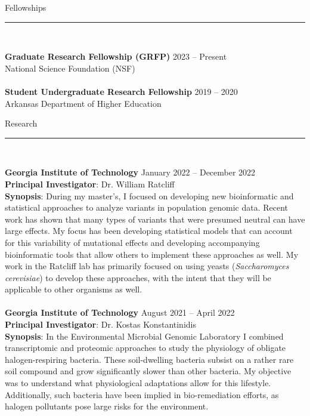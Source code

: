 \documentclass{article}
\begin{document}
\begin{flushleft}
{\Large Fellowships} \rule{16.51cm}{0.4pt}\\
\end{flushleft}
\textbf{Graduate Research Fellowship (GRFP)} \hfill 2023 – Present \\
National Science Foundation (NSF)
\\
\\
\textbf{Student Undergraduate Research Fellowship} \hfill 2019 – 2020 \\
Arkansas Department of Higher Education
\\
\begin{flushleft}
{\Large Research} \rule{16.51cm}{0.4pt}\\
\end{flushleft}
\textbf{Georgia Institute of Technology} \hfill January 2022 – December 2022 \\
\textbf{Principal Investigator}: Dr. William Ratcliff \\
\textbf{Synopsis}: During my master's, I focused on developing new bioinformatic and 
statistical approaches to analyze variants in population genomic data. 
Recent work has shown that many types of variants that were presumed neutral can have large effects. My focus has been developing statistical 
models that can account for this variability of mutational effects and developing accompanying bioinformatic tools that allow others to implement 
these approaches as well. My work in the Ratcliff lab has primarily focused on using yeasts (\emph{Saccharomyces cerevisiae}) to develop these approaches, 
with the intent that they will be applicable to other organisms as well. \\
\\
\textbf{Georgia Institute of Technology} \hfill August 2021 – April 2022 \\
\textbf{Principal Investigator}: Dr. Kostas Konstantinidis \\
\textbf{Synopsis}: In the Environmental Microbial Genomic Laboratory I combined transcriptomic and proteomic approaches to study the physiology of 
obligate halogen-respiring bacteria. These soil-dwelling bacteria subsist on a rather rare soil compound and grow significantly slower than other bacteria. 
My objective was to understand what physiological adaptations allow for this lifestyle. Additionally, such bacteria have been implied in bio-remediation 
efforts, as halogen pollutants pose large risks for the environment.\\
\end{document}
